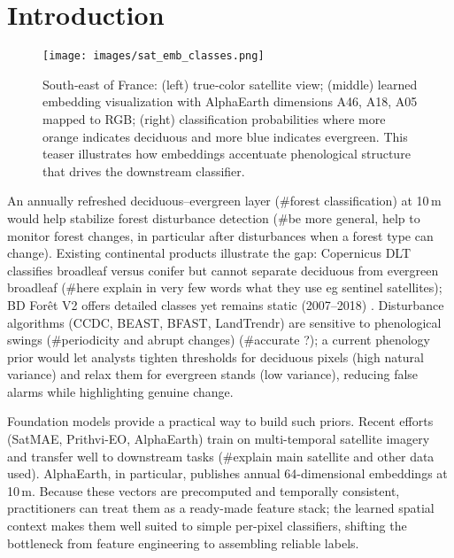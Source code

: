 \documentclass[utf8]{FrontiersinHarvard}
\begin{document}
\section{Introduction}

\begin{figure}[H]
    \centering
    \texttt{[image: images/sat\_emb\_classes.png]}
    \caption{South‑east of France: (left) true‑color satellite view; (middle) learned embedding visualization with AlphaEarth dimensions A46, A18, A05 mapped to RGB; (right) classification probabilities where more orange indicates deciduous and more blue indicates evergreen. This teaser illustrates how embeddings accentuate phenological structure that drives the downstream classifier.}
    \label{fig:teaser_sat_emb_class}
\end{figure}

An annually refreshed deciduous–evergreen layer (#forest classification) at 10\,m would help stabilize forest disturbance detection (#be more general, help to monitor forest changes, in particular after disturbances when a forest type can change). Existing continental products illustrate the gap: Copernicus DLT classifies broadleaf versus conifer but cannot separate deciduous from evergreen broadleaf \citep{EU2024a} (#here explain in very few words what they use eg sentinel satellites); BD Forêt V2 offers detailed classes yet remains static (2007–2018) \citep{IGN2024}. Disturbance algorithms (CCDC, BEAST, BFAST, LandTrendr) are sensitive to phenological swings (#periodicity and abrupt changes) \citep{Zhu2014,Zhao2019,Verbesselt2010a,Verbesselt2010b,Kennedy2010,Kennedy2018} (#accurate ?); a current phenology prior would let analysts tighten thresholds for deciduous pixels (high natural variance) and relax them for evergreen stands (low variance), reducing false alarms while highlighting genuine change.

Foundation models provide a practical way to build such priors. Recent efforts (SatMAE, Prithvi-EO, AlphaEarth) train on multi-temporal satellite imagery and transfer well to downstream tasks \citep{Cong2022,Szwarcman2024PrithviEO2,AlphaEarth2025} (#explain main satellite and other data used). AlphaEarth, in particular, publishes annual 64-dimensional embeddings at 10\,m. Because these vectors are precomputed and temporally consistent, practitioners can treat them as a ready-made feature stack; the learned spatial context makes them well suited to simple per-pixel classifiers, shifting the bottleneck from feature engineering to assembling reliable labels.
\end{document}
